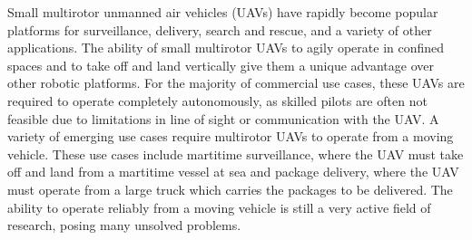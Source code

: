 
Small multirotor unmanned air vehicles (UAVs) have rapidly become popular platforms for
surveillance, delivery, search and rescue, and a variety of other applications.
The ability of small multirotor UAVs to agily operate in confined spaces and to
take off and land vertically give them a unique advantage over other robotic
platforms. For the majority of commercial use cases, these UAVs are required to operate
completely autonomously, as skilled pilots are often not feasible due to
limitations in line of sight or communication with the UAV. 
A variety of emerging use cases
require multirotor UAVs to operate from a moving vehicle.
These use
cases include martitime surveillance, where the UAV must take off and land from
a martitime vessel at sea
and package delivery, where the UAV must operate from a large truck
which carries the packages to be delivered. The ability to operate reliably from a
moving vehicle is still a very active field of research, posing many unsolved
problems.



